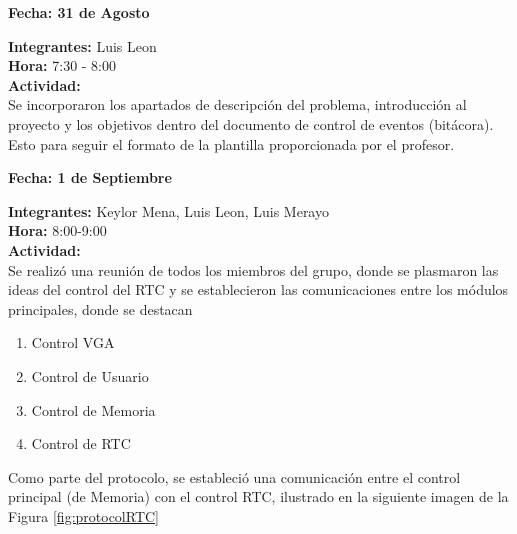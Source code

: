 \documentclass[12pt,a4paper]{report}
\begin{document}
\newpage

\begin{flushright}
	\begin{large}
		\textbf{Fecha: 31 de Agosto}\\[5ex]
	\end{large}
\end{flushright}

\noindent \textbf{Integrantes:} Luis Leon \\[1ex]
\textbf{Hora:} 7:30 - 8:00 \\[1ex]
\textbf{Actividad:} \\[2ex]

Se incorporaron los apartados de descripción del problema, introducción al proyecto y los objetivos dentro del documento de control de eventos (bitácora). Esto para seguir el formato de la plantilla proporcionada por el profesor. \\[2ex]

\begin{flushright}
	\begin{large}
		\textbf{Fecha: 1 de Septiembre}\\[5ex]
	\end{large}
\end{flushright}

\noindent \textbf{Integrantes:} Keylor Mena, Luis Leon, Luis Merayo \\[1ex]
\textbf{Hora:} 8:00-9:00\\[1ex]
\textbf{Actividad:} \\[2ex]

Se realizó una reunión de todos los miembros del grupo, donde se plasmaron las ideas del control del RTC y se establecieron las comunicaciones entre los módulos principales, donde se destacan \\

\begin{enumerate}
	\item Control VGA
	\item Control de Usuario
	\item Control de Memoria
	\item Control de RTC
\end{enumerate}

Como parte del protocolo, se estableció una comunicación entre el control principal (de Memoria) con el control RTC, ilustrado en la siguiente imagen de la Figura \ref{fig:protocolRTC} \\
\end{document}
